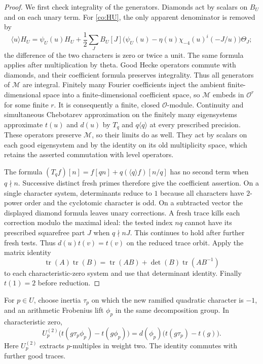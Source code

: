 \begin{proof}
We first check integrality of the generators.  Diamonds act by scalars
on $B_U$ and on each unary term.  For \eqref{co:HU}, the only apparent
denominator is removed by
\[
 \langle u\rangle H_U=\psi_U(u)H_U+
 \frac12\sum_J B_U[J]
 \bigl(\psi_U(u)-\eta(u)\chi_{-4}(u)^i(-J/u)\bigr)\Theta_J;
\]
the difference of the two characters is zero or twice a unit.
The same formula applies after multiplication by theta.
Good Hecke operators commute with diamonds, and their coefficient
formula preserves integrality.  Thus all generators of $\mathcal M$
are integral.  Finitely many Fourier coefficients inject the ambient
finite-dimensional space into a finite-dimensional coefficient space,
so $\mathcal M$ embeds in $\mathcal O^r$ for some finite $r$.
It is consequently a finite, closed $\mathcal O$-module.
Continuity and simultaneous Chebotarev approximation on the finitely
many eigensystems approximate $t(u)$ and $d(u)$ by $T_q$ and
$q\langle q\rangle$ at every prescribed precision.  These operators
preserve $\mathcal M$, so their limits do as well.  They act by scalars
on each good eigensystem and by the identity on its old multiplicity
space, which retains the asserted commutation with level operators.

The formula
$(T_qf)[n]=f[qn]+q(\langle q\rangle f)[n/q]$ has no second term
when $q\nmid n$.  Successive distinct fresh primes therefore give
the coefficient assertion.  On a single character system,
determinants reduce to $1$ because all characters have $2$-power
order and the cyclotomic character is odd.  On a subtracted vector
the displayed diamond formula leaves unary corrections.  A fresh
trace kills each correction modulo the maximal ideal: the tested
index $nq$ cannot have its prescribed squarefree part $J$ when
$q\nmid nJ$.  This continues to hold after further fresh tests.
Thus $d(u)t(v)=t(v)$ on the reduced trace orbit.  Apply the matrix
identity
\[
 \operatorname{tr}(A)\operatorname{tr}(B)
  =\operatorname{tr}(AB)+\det(B)\operatorname{tr}(AB^{-1})
\]
to each characteristic-zero system and use that determinant
identity.  Finally $t(1)=2$ before reduction.
\end{proof}

\begin{lemma}\label{co:inertia}
For $p\in U$, choose inertia $\tau_p$ on which the new ramified
quadratic character is $-1$, and an arithmetic Frobenius lift $\phi_p$
in the same decomposition group.  In characteristic zero,
\begin{equation}\label{co:inertia-identity}
 U_p^{(2)}\bigl(t(g\tau_p\phi_p)-t(g\phi_p)\bigr)
   =d(\phi_p)\bigl(t(g\tau_p)-t(g)\bigr).
\end{equation}
Here $U_p^{(2)}$ extracts $p$-multiples in weight two.  The identity
commutes with further good traces.
\end{lemma}

